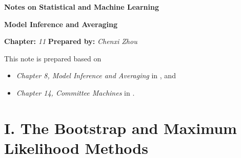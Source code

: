 \documentclass[12pt]{article}
\newcommand{\titlebox}[4]{
\begin{tcolorbox}[colback = blue!5!white!95, colframe = blue!70!black
]
  \noindent \textbf{ #1 } \hfill \textit{#2} 
  \begin{center}
  	 \LARGE{\textbf{#3}}
  \end{center}
\textbf{Chapter:} \textit{#4} \hfill \textbf{Prepared by:} \textit{Chenxi Zhou}
\end{tcolorbox}
}
\begin{document}
\titlebox{Notes on Statistical and Machine Learning}{}{Model Inference and Averaging}{11}
\thispagestyle{plain}

\vspace{10pt}

This note is prepared based on 
\begin{itemize}
	\item \textit{Chapter 8, Model Inference and Averaging} in \textcite{Friedman2001-np}, and 
	\item \textit{Chapter 14, Committee Machines} in \textcite{Izenman2009-jk}. 
\end{itemize}


\section*{I. The Bootstrap and Maximum Likelihood Methods}
\end{document}
